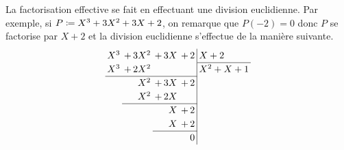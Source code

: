 \documentclass{magnolia}
\begin{document}
\begin{remarques}
\remarque La factorisation
effective se fait en effectuant une division euclidienne. Par exemple, si $P\coloneqq X^3+3X^2+3X+2$, on
remarque que $P(-2)=0$ donc $P$ se factorise par $X+2$ et la division euclidienne s'effectue de la manière
suivante.
\begin{equation*}
\renewcommand{\arraystretch}{1.2}
\renewcommand{\arraycolsep}{2pt}
\begin{array}{rrrr|l}
X^3 & +\,3X^2 & +\,3X & +\,2 & X + 2 \\
\cline{5-5}
X^3 & +\,2X^2 &   &  & X^2+X+1 \\
\cline{1-4}
    & X^2 &  +\,3X & +\,2 &     \\
    & X^2 & +\,2X &  &   \\
    \cline{2-4}
    &     & X & +\,2 &   \\
    &     & X & +\,2 &    \\
              \cline{3-4}
    &     &   &0&   
\end{array}
\end{equation*}


\end{remarques}
\end{document}
